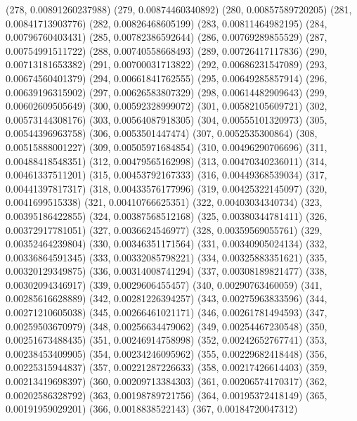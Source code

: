 {					(278, 0.00891260237988)
					(279, 0.00874460340892)
					(280, 0.00857589720205)
					(281, 0.00841713903776)
					(282, 0.00826468605199)
					(283, 0.00811464982195)
					(284, 0.00796760403431)
					(285, 0.00782386592644)
					(286, 0.00769289855529)
					(287, 0.00754991511722)
					(288, 0.00740558668493)
					(289, 0.00726417117836)
					(290, 0.00713181653382)
					(291, 0.00700031713822)
					(292, 0.00686231547089)
					(293, 0.00674560401379)
					(294, 0.00661841762555)
					(295, 0.00649285857914)
					(296, 0.00639196315902)
					(297, 0.00626583807329)
					(298, 0.00614482909643)
					(299, 0.00602609505649)
					(300, 0.00592328999072)
					(301, 0.00582105609721)
					(302, 0.00573144308176)
					(303, 0.00564087918305)
					(304, 0.00555101320973)
					(305, 0.00544396963758)
					(306, 0.0053501447474)
					(307, 0.0052535300864)
					(308, 0.00515888001227)
					(309, 0.00505971684854)
					(310, 0.00496290706696)
					(311, 0.00488418548351)
					(312, 0.00479565162998)
					(313, 0.00470340236011)
					(314, 0.00461337511201)
					(315, 0.00453792167333)
					(316, 0.00449368539034)
					(317, 0.00441397817317)
					(318, 0.00433576177996)
					(319, 0.00425322145097)
					(320, 0.0041699515338)
					(321, 0.00410766625351)
					(322, 0.00403034340734)
					(323, 0.00395186422855)
					(324, 0.00387568512168)
					(325, 0.00380344781411)
					(326, 0.00372917781051)
					(327, 0.0036624546977)
					(328, 0.00359569055761)
					(329, 0.00352464239804)
					(330, 0.00346351171564)
					(331, 0.00340905024134)
					(332, 0.00336864591345)
					(333, 0.00332085798221)
					(334, 0.00325883351621)
					(335, 0.00320129349875)
					(336, 0.00314008741294)
					(337, 0.00308189821477)
					(338, 0.00302094346917)
					(339, 0.0029606455457)
					(340, 0.00290763460059)
					(341, 0.00285616628889)
					(342, 0.00281226394257)
					(343, 0.00275963833596)
					(344, 0.00271210605038)
					(345, 0.00266461021171)
					(346, 0.00261781494593)
					(347, 0.00259503670979)
					(348, 0.00256634479062)
					(349, 0.00254467230548)
					(350, 0.00251673488435)
					(351, 0.00246914758998)
					(352, 0.00242652767741)
					(353, 0.00238453409905)
					(354, 0.00234246095962)
					(355, 0.00229682418448)
					(356, 0.00225315944837)
					(357, 0.00221287226633)
					(358, 0.00217426614403)
					(359, 0.00213419698397)
					(360, 0.00209713384303)
					(361, 0.00206574170317)
					(362, 0.00202586328792)
					(363, 0.00198789721756)
					(364, 0.00195372418149)
					(365, 0.00191959029201)
					(366, 0.0018838522143)
					(367, 0.00184720047312)
}
